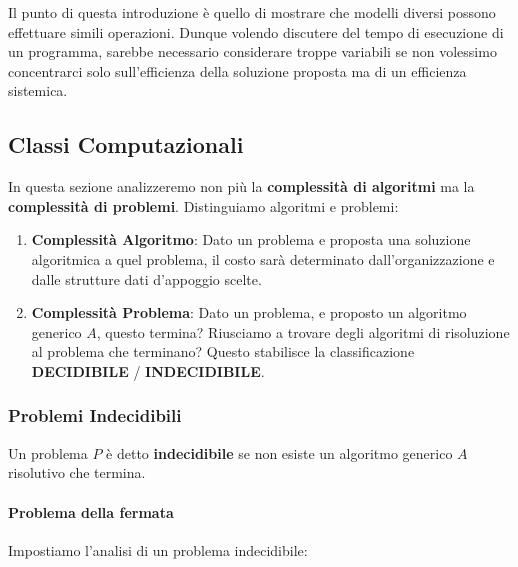 \documentclass{article}
\begin{document}
Il punto di questa introduzione è quello di mostrare che modelli diversi possono effettuare simili operazioni. Dunque volendo discutere del tempo di esecuzione di un programma, sarebbe necessario considerare troppe variabili se non volessimo concentrarci solo sull'efficienza della soluzione proposta ma di un efficienza sistemica.

\subsection{Classi Computazionali}

In questa sezione analizzeremo non più la \textbf{complessità di algoritmi} ma la \textbf{complessità di problemi}. Distinguiamo algoritmi e problemi:

\begin{enumerate}
    \item \textbf{Complessità Algoritmo}: Dato un problema e proposta una soluzione algoritmica a quel problema, il costo sarà determinato dall'organizzazione e dalle strutture dati d'appoggio scelte.
    \item \textbf{Complessità Problema}: Dato un problema, e proposto un algoritmo generico $A$, questo termina? Riusciamo a trovare degli algoritmi di risoluzione al problema che terminano? Questo stabilisce la classificazione \textbf{DECIDIBILE} / \textbf{INDECIDIBILE}.
\end{enumerate}

\newpage

\subsubsection{Problemi Indecidibili}

Un problema $P$ è detto \textbf{indecidibile} se non esiste un algoritmo generico $A$ risolutivo che termina.

\paragraph{Problema della fermata} Impostiamo l'analisi di un problema indecidibile:
\end{document}
